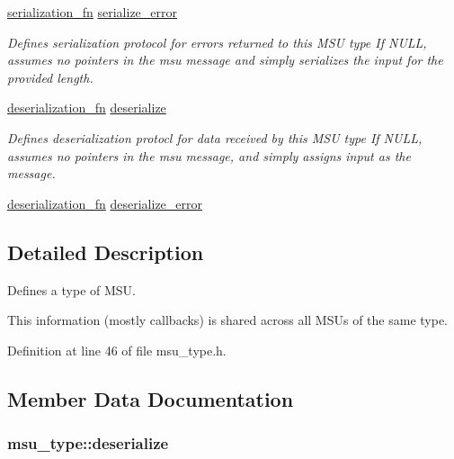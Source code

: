 \begin{DoxyCompactItemize}
\hyperlink{msu__type_8h_a17ed2199cfcb2244df8020d04c232a78}{serialization\-\_\-fn} \hyperlink{structmsu__type_a765dacf40ac27344e2411e1c4e77a5a9}{serialize\-\_\-error}
\begin{DoxyCompactList}\small\item\em Defines serialization protocol for errors returned to this M\-S\-U type If N\-U\-L\-L, assumes no pointers in the msu message and simply serializes the input for the provided length. \end{DoxyCompactList}\item 
\hyperlink{msu__type_8h_aa99471a7e82985e3deaaa6fa5721a70a}{deserialization\-\_\-fn} \hyperlink{structmsu__type_ad8ac9a913eb05ae392f3eed04f323a5d}{deserialize}
\begin{DoxyCompactList}\small\item\em Defines deserialization protocl for data received by this M\-S\-U type If N\-U\-L\-L, assumes no pointers in the msu message, and simply assigns {\ttfamily input} as the message. \end{DoxyCompactList}\item 
\hyperlink{msu__type_8h_aa99471a7e82985e3deaaa6fa5721a70a}{deserialization\-\_\-fn} \hyperlink{structmsu__type_aef2ca86cf163e5ff1464a65cde717503}{deserialize\-\_\-error}
\end{DoxyCompactItemize}


\subsection{Detailed Description}
Defines a type of M\-S\-U. 

This information (mostly callbacks) is shared across all M\-S\-Us of the same type. 

Definition at line 46 of file msu\-\_\-type.\-h.



\subsection{Member Data Documentation}
\hypertarget{structmsu__type_ad8ac9a913eb05ae392f3eed04f323a5d}{
\subsubsection[{deserialize}]{ msu\-\_\-type\-::deserialize}}\label{structmsu__type_ad8ac9a913eb05ae392f3eed04f323a5d}


